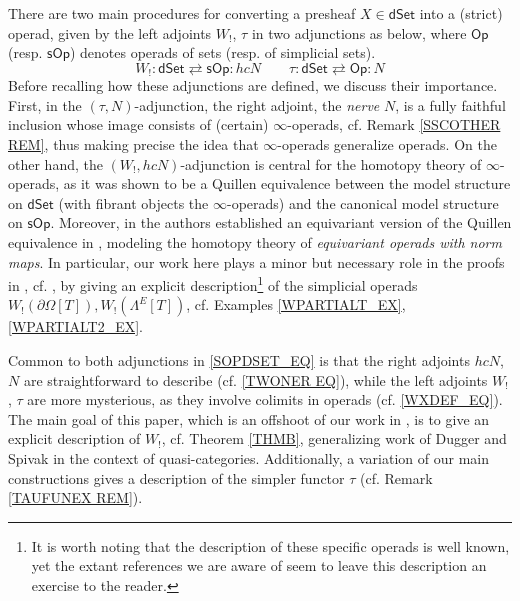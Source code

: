 \documentclass[a4paper,10pt
,draft
]{article}%
\numberwithin{equation}{section}
\numberwithin{figure}{section}
\theoremstyle{definition} %
\newcommand{\Op}{\mathsf{Op}}%
\newcommand{\sOp}{\ensuremath{\mathsf{sOp}}}%
\newcommand{\dSet}{\mathsf{dSet}}
\newcommand{\1}{\ensuremath{\mathbbm 1}}%
\begin{document}
There are two main procedures for converting a presheaf
$X \in \mathsf{dSet}$
into a (strict) operad,
given by the left adjoints
$W_!$, $\tau$
in two adjunctions as below,
where $\Op$ (resp. $\sOp$) 
denotes operads of sets (resp. of simplicial sets).
\begin{equation}\label{SOPDSET_EQ}
	W_! \colon \dSet \rightleftarrows \sOp \colon h c N
	\qquad
	\tau \colon \dSet \rightleftarrows \Op \colon N
\end{equation}
Before recalling how these adjunctions are defined,
we discuss their importance. 
First, in the $(\tau,N)$-adjunction,
the right adjoint, the \emph{nerve} $N$,
is a fully faithful inclusion whose image consists of 
(certain) $\infty$-operads, 
cf. Remark \ref{SSCOTHER REM},
thus making precise the idea that 
$\infty$-operads generalize operads.
On the other hand, the $(W_!,hcN)$-adjunction
is central for the homotopy theory of $\infty$-operads,
as it was shown to be a Quillen equivalence \cite{CM13b}
between the model structure on $\dSet$ 
(with fibrant objects the $\infty$-operads)
and the canonical model structure on $\sOp$.
Moreover, in \cite{BP_TAS} the authors established an equivariant
version of the Quillen equivalence in \cite{CM13b},
modeling the homotopy theory of 
\emph{equivariant operads with norm maps}.
In particular, 
our work here plays a minor but necessary role in the proofs
in \cite{BP_TAS},
cf. \cite[Lemma \ref{TAS-WLEFTQPUSH LEM}]{BP_TAS},
by giving an explicit description\footnote{It is worth noting that the description of these specific operads is well known,
yet the extant references we are aware of seem to leave
this description an exercise to the reader.}
of the simplicial operads
$W_!(\partial \Omega[T]),W_!(\Lambda^E[T])$,
cf. Examples \ref{WPARTIALT_EX},\ref{WPARTIALT2_EX}.


Common to both adjunctions in \eqref{SOPDSET_EQ}
is that the right adjoints
$hcN$, $N$ are straightforward to describe
(cf. \eqref{TWONER EQ}), 
while the left adjoints $W_!$, $\tau$ are more mysterious,
as they involve colimits in operads (cf. \eqref{WXDEF_EQ}).
The main goal of this paper, 
which is an offshoot of our work in \cite{BP_TAS},
is to give an explicit description of $W_!$,
cf. Theorem \ref{THMB},
generalizing work of Dugger and Spivak \cite{DS11}
in the context of quasi-categories.
Additionally, a variation of our main constructions
gives a description of the simpler functor $\tau$
(cf. Remark \ref{TAUFUNEX REM}).
\end{document}
